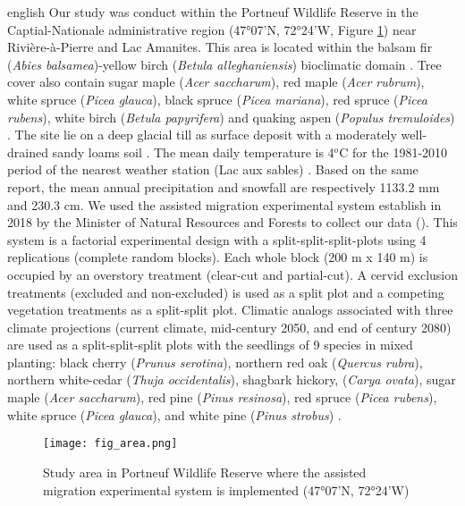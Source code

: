 \begin{otherlanguage*}{english}
  Our study was conduct within the Portneuf Wildlife Reserve in the Captial-Nationale administrative region (47°07'N, 72°24'W, Figure \ref{fig:area}) near Rivière-à-Pierre and Lac Amanites. 
  This area is located within the balsam fir (\textit{Abies balsamea})-yellow birch (\textit{Betula alleghaniensis}) bioclimatic domain \citep{saucierChapitreEcologieForestiere2009}.
  Tree cover also contain sugar maple (\textit{Acer saccharum}), red maple (\textit{Acer rubrum}), white spruce (\textit{Picea glauca}), black spruce (\textit{Picea mariana}), red spruce (\textit{Picea rubens}), white birch (\textit{Betula papyrifera}) and quaking aspen (\textit{Populus tremuloides}) \citep{olaBelowgroundCarbonStocks2024}. 
  The site lie on a deep glacial till as surface deposit with a moderately well-drained sandy loams soil \citep{CanadianSystemSoil1998}.
  The mean daily temperature is 4$^{o}$C for the 1981-2010 period of the nearest weather station (Lac aux sables) \citep{environmentcanadaCanadianClimateNormals2019}. 
  Based on the same report, the mean annual precipitation and snowfall are respectively 1133.2 mm and 230.3 cm.
  We used the assisted migration experimental system establish in 2018 by the Minister of Natural Resources and Forests to collect our data (\citealp{royoDesiredREgenerationAssisted2023}).
  This system is a factorial experimental design with a split-split-split-plots using 4 replications (complete random blocks). 
  Each whole block (200 m x 140 m) is occupied by an overstory treatment (clear-cut and partial-cut). 
  A cervid exclusion treatments (excluded and non-excluded) is used as a split plot and a competing vegetation treatments as a split-split plot. 
  Climatic analogs associated with three climate projections (current climate, mid-century 2050, and end of century 2080) 
  are used as a split-split-split plots with the seedlings of 9 species in mixed planting: black cherry (\textit{Prunus serotina}), northern red oak (\textit{Quercus rubra}), 
  northern white-cedar (\textit{Thuja occidentalis}), shagbark hickory, (\textit{Carya ovata}), sugar maple (\textit{Acer saccharum}), red pine (\textit{Pinus resinosa}), 
  red spruce (\textit{Picea rubens}), white spruce (\textit{Picea glauca}), and white pine (\textit{Pinus strobus}) \citep{royoDesiredREgenerationAssisted2023}.

\end{otherlanguage*}

\begin{figure}[ht!]
	\centering
	\texttt{[image: fig\_area.png]}
	\caption[Study area in Portneuf Wildlife Reserve, Québec, Canada]{Study area in Portneuf Wildlife Reserve where the assisted migration experimental system is implemented (47°07'N, 72°24'W)}
	\label{fig:area}
	\end{figure}  



